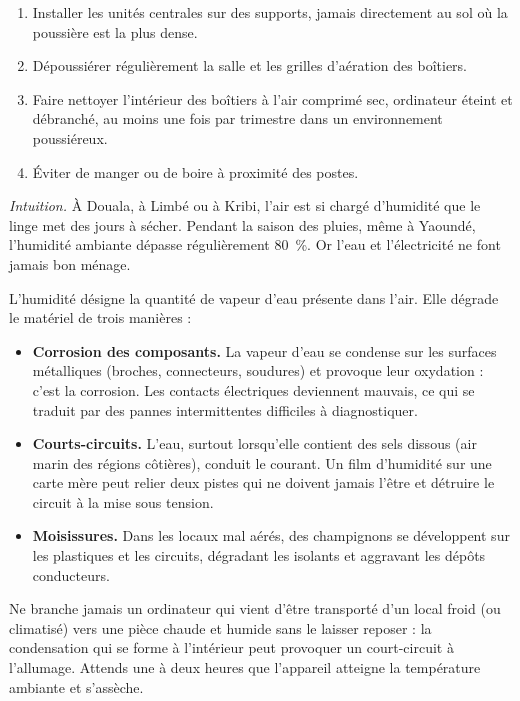 \documentclass[11pt]{article}
\newcommand{\cle}[1]{{\popxbold\color{popdark}#1}}
\newcounter{popsec}
\newcounter{popsub}
\newcommand{\courssub}[1]{%
  \stepcounter{popsub}%
  \par\vspace{9pt}\noindent{\popxbold\fontsize{11.5}{13}\selectfont\color{popink}{\color{poporange}\thepopsec.\thepopsub}\hspace{6pt}#1}\par\nopagebreak\vspace{4pt}
}
\begin{document}
\begin{methode}
\begin{enumerate}
  \item Installer les unités centrales sur des supports, jamais directement au sol où la poussière est la plus dense.
  \item Dépoussiérer régulièrement la salle et les grilles d'aération des boîtiers.
  \item Faire nettoyer l'intérieur des boîtiers à l'air comprimé sec, ordinateur éteint et débranché, au moins une fois par trimestre dans un environnement poussiéreux.
  \item Éviter de manger ou de boire à proximité des postes.
\end{enumerate}
\end{methode}

\courssub{L'humidité : la corrosion silencieuse}

\emph{Intuition.} À Douala, à Limbé ou à Kribi, l'air est si chargé d'humidité que le linge met des jours à sécher. Pendant la saison des pluies, même à Yaoundé, l'humidité ambiante dépasse régulièrement 80~\%. Or l'eau et l'électricité ne font jamais bon ménage.

L'\cle{humidité} désigne la quantité de vapeur d'eau présente dans l'air. Elle dégrade le matériel de trois manières :

\begin{itemize}
  \item \textbf{Corrosion des composants.} La vapeur d'eau se condense sur les surfaces métalliques (broches, connecteurs, soudures) et provoque leur oxydation : c'est la \cle{corrosion}. Les contacts électriques deviennent mauvais, ce qui se traduit par des pannes intermittentes difficiles à diagnostiquer.
  \item \textbf{Courts-circuits.} L'eau, surtout lorsqu'elle contient des sels dissous (air marin des régions côtières), conduit le courant. Un film d'humidité sur une carte mère peut relier deux pistes qui ne doivent jamais l'être et détruire le circuit à la mise sous tension.
  \item \textbf{Moisissures.} Dans les locaux mal aérés, des champignons se développent sur les plastiques et les circuits, dégradant les isolants et aggravant les dépôts conducteurs.
\end{itemize}

\begin{attention}
Ne branche jamais un ordinateur qui vient d'être transporté d'un local froid (ou climatisé) vers une pièce chaude et humide sans le laisser reposer : la condensation qui se forme à l'intérieur peut provoquer un court-circuit à l'allumage. Attends une à deux heures que l'appareil atteigne la température ambiante et s'assèche.
\end{attention}
\end{document}
